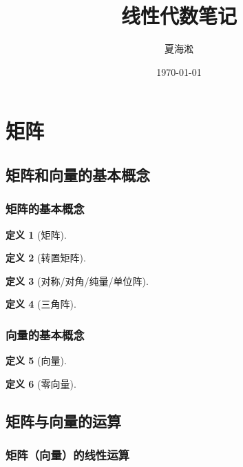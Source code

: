 \documentclass{ctexart}
\author{夏海淞}
\title{线性代数笔记}
\date{\today}
\newtheorem{definition}{定义}[subsection]
\begin{document}
    \maketitle
    \tableofcontents
\section{矩阵}

\subsection{矩阵和向量的基本概念}

\subsubsection{矩阵的基本概念}

\begin{definition}[矩阵]
    
\end{definition}
\begin{definition}[转置矩阵]
    
\end{definition}
\begin{definition}[对称/对角/纯量/单位阵]
    
\end{definition}
\begin{definition}[三角阵]
    
\end{definition}

\subsubsection{向量的基本概念}

\begin{definition}[向量]
    
\end{definition}
\begin{definition}[零向量]
    
\end{definition}

\subsection{矩阵与向量的运算}

\subsubsection{矩阵（向量）的线性运算}
\end{document}

